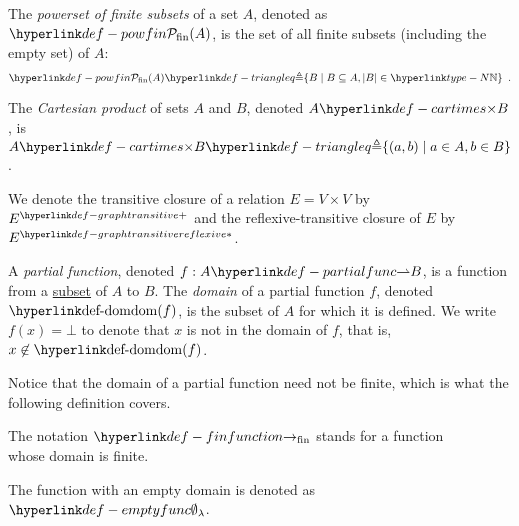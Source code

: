\hypertarget{def-powfin}{}
\begin{definition}
  The \emph{powerset of finite subsets} of a set $A$, denoted as $\powfin{A}$, is the set of all finite subsets (including the empty set) of $A$:
  \[
     \powfin{A} \triangleq \{ B \;|\; B \subseteq A, |B| \in \N\} \enspace.
  \]
\end{definition}

\hypertarget{def-cartimes}{}
\begin{definition}
    The \emph{Cartesian product} of sets $A$ and $B$, denoted $A \cartimes B$,
    is $A \cartimes B \triangleq \{(a,b) \;|\; a \in A, b \in B\}$.
\end{definition}

\hypertarget{def-graphtransitive}{}
\hypertarget{def-graphtransitivereflexive}{}
\begin{definition}
We denote the transitive closure of a relation $E = V \times V$ by $\graphtransitive{E}$
and the reflexive-transitive closure of $E$ by $\graphtransitivereflexive{E}$.
\end{definition}

\hypertarget{def-partialfunc}{}
\hypertarget{def-dom}{}
\begin{definition}
  A \emph{partial function}, denoted $f : A \partialto B$, is a function from a \underline{subset} of $A$ to $B$.
  The \emph{domain} of a partial function $f$, denoted $\dom(f)$, is the subset of $A$ for which it is defined.
  We write $f(x) = \bot$ to denote that $x$ is not in the domain of $f$, that is, $x \not\in \dom(f)$.
\end{definition}

Notice that the domain of a partial function need not be finite, which is what the following definition covers.

\hypertarget{def-finfunction}{}
\begin{definition}
The notation $\rightarrowfin$ stands for a function \\ whose domain is finite.
\end{definition}

\hypertarget{def-emptyfunc}{}
\begin{definition}
The function with an empty domain is denoted as $\emptyfunc$.
\end{definition}

